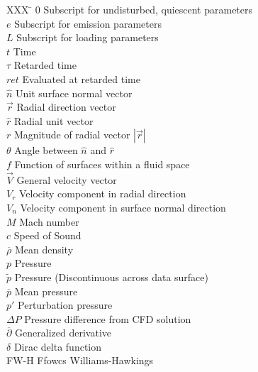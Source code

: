 \documentclass[]{aiaa-tc}%
\begin{document}
\begin{multicols}{2}
\begin{tabbing}
  XXX \= \kill%
  $0$                 \> Subscript for undisturbed, quiescent parameters \\
  $e$                 \> Subscript for emission parameters \\
  $L$                 \> Subscript for loading parameters \\
  $t$                 \> Time \\
  $\tau$              \> Retarded time \\
  $ret$               \> Evaluated at retarded time \\
  $\hat{n}$           \> Unit surface normal vector \\
  $\vec{r}$           \> Radial direction vector \\
  $\hat{r}$           \> Radial unit vector \\
  $r$                 \> Magnitude of radial vector $|\vec{r}|$ \\
  $\theta$            \> Angle between $\hat{n}$ and $\hat{r}$ \\
  $f$                 \> Function of surfaces within a fluid space \\
  $\vec{V}$           \> General velocity vector \\
  $V_r$               \> Velocity component in radial direction \\
  $V_n$               \> Velocity component in surface normal direction \\
  $M$                 \> Mach number \\
  $c$                 \> Speed of Sound\\
  $\overline{\rho}$   \> Mean density \\
  $p$                 \> Pressure  \\
  $\widetilde{p}$     \> Pressure (Discontinuous across data surface)  \\
  $\overline{p}$      \> Mean pressure \\
  $p'$                \> Perturbation pressure \\
  $\Delta P$          \> Pressure difference from CFD solution \\
  $\overline{\partial}$ \> Generalized derivative \\
  $\delta$            \> Dirac delta function \\
  \scriptsize{FW-H}   \> Ffowcs Williams-Hawkings\\






\end{tabbing}

\end{multicols}
\end{document}
